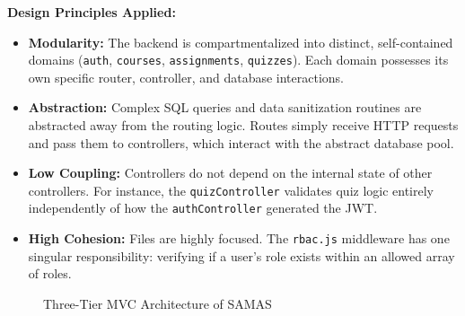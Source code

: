 \documentclass[12pt, a4paper]{report}
\begin{document}
\textbf{Design Principles Applied:}
\begin{itemize}[noitemsep]
    \item \textbf{Modularity:} The backend is compartmentalized into distinct, self-contained domains (\texttt{auth}, \texttt{courses}, \texttt{assignments}, \texttt{quizzes}). Each domain possesses its own specific router, controller, and database interactions.
    \item \textbf{Abstraction:} Complex SQL queries and data sanitization routines are abstracted away from the routing logic. Routes simply receive HTTP requests and pass them to controllers, which interact with the abstract database pool.
    \item \textbf{Low Coupling:} Controllers do not depend on the internal state of other controllers. For instance, the \texttt{quizController} validates quiz logic entirely independently of how the \texttt{authController} generated the JWT.
    \item \textbf{High Cohesion:} Files are highly focused. The \texttt{rbac.js} middleware has one singular responsibility: verifying if a user's role exists within an allowed array of roles.
\end{itemize}

\begin{figure}[H]
\centering
{}
\caption{Three-Tier MVC Architecture of SAMAS}
\end{figure}
\end{document}
